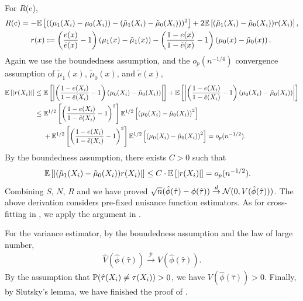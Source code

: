     For $R$(c),
    \begin{align}\label{proof:absolute.error.R}
        \begin{split}
          R\text{(c)}
          &= -\mathbb{E}\left[((\mu_1(X_i) - \mu_0(X_i)) - (\tilde{\mu}_1(X_i) - \tilde{\mu}_0(X_i)))^2\right] + 2 \mathbb{E}\left[(\tilde{\mu}_1(X_i) - \tilde{\mu}_0(X_i)) r(X_i)\right], \\
          &\quad~r(x) := \left( \frac{e(x)}{\tilde{e}(x)} - 1 \right) \left( \mu_1(x) - \tilde{\mu}_1(x) \right) 
          - \left( \frac{1 - e(x)}{1 - \tilde{e}(x)} - 1 \right) \left( \mu_0(x) - \tilde{\mu}_0(x) \right).
        \end{split}
    \end{align}
    Again we use the boundedness assumption, and the $o_p(n^{-1/4})$ convergence assumption of $\tilde{\mu}_1(x)$, $\tilde{\mu}_0(x)$, and $\tilde{e}(x)$,
    \begin{align*}
        \mathbb{E}\left[|r(X_i)|\right]
        &\le \mathbb{E} \left[\left
        |\left(\frac{1 - e(X_i)}{1 - \tilde{e}(X_i)} - 1 \right) \left( \mu_0(X_i) - \tilde{\mu}_0(X_i) \right)\right|\right]
        + \mathbb{E}\left[\left| \left(\frac{1 - e(X_i)}{1 - \tilde{e}(X_i)} - 1 \right) \left( \mu_0(X_i) - \tilde{\mu}_0(X_i) \right)\right|\right]\\
        &\le \mathbb{E}^{1/2} \left[\left
        (\frac{1 - e(X_i)}{1 - \tilde{e}(X_i)} - 1 \right)^2 \right]  \mathbb{E}^{1/2} \left[\left( \mu_0(X_i) - \tilde{\mu}_0(X_i) \right)^2\right]\\
        &\quad~+  \mathbb{E}^{1/2}\left[\left( \frac{1 - e(X_i)}{1 - \tilde{e}(X_i)} - 1 \right)^2\right] \mathbb{E}^{1/2} \left[ \left( \mu_0(X_i) - \tilde{\mu}_0(X_i) \right)^2\right]
        = o_p(n^{-1/2}).
    \end{align*}
    By the boundedness assumption, there exists $C > 0$ such that
    \begin{align*}
        \mathbb{E}\left[\left|(\tilde{\mu}_1(X_i) - \tilde{\mu}_0(X_i)) r(X_i)\right|\right]
        &\le C \cdot \mathbb{E}\left[|r(X_i)|\right] 
        = o_p(n^{-1/2}).
    \end{align*}
    Combining $S$, $N$, $R$ and we have proved $\sqrt{n}(\hat{\phi}(\hat{\tau}) - {\phi}(\hat{\tau})) \stackrel{d}{\to} \mathcal{N}(0, {V}(\hat{\phi}(\hat{\tau})))$.
    The above derivation considers pre-fixed nuisance function estimators. As for cross-fitting in , we apply the argument in \cite{chernozhukov2018double}.
    

    For the variance estimator, by the boundedness assumption and the law of large number,
    \begin{align*}
        \hat{V}(\hat{\phi}(\hat{\tau})) \stackrel{p}{\to} {V}(\hat{\phi}(\hat{\tau})).
    \end{align*}
    By the assumption that $\mathbb{P}(\hat{\tau}(X_i) \neq {\tau}(X_i)) > 0$, we have ${V}(\hat{\phi}(\hat{\tau})) > 0$.
    Finally, by Slutsky's lemma, we have finished the proof of .
    



